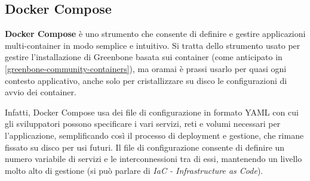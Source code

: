 \subsection{Docker Compose}
\label{docker-compose}
\textbf{Docker Compose} \cite{docker-compose} è uno strumento che consente di definire e gestire applicazioni multi-container in modo semplice e intuitivo. Si tratta dello strumento usato per gestire l'installazione di Greenbone basata sui container (come anticipato in \ref{greenbone-community-containers}), ma oramai è prassi usarlo per quasi ogni contesto applicativo, anche solo per cristallizzare su disco le configurazioni di avvio dei container.

Infatti, Docker Compose usa dei file di configurazione in formato YAML con cui gli sviluppatori possono specificare i vari servizi, reti e volumi necessari per l'applicazione, semplificando così il processo di deployment e gestione, che rimane fissato su disco per usi futuri. Il file di configurazione consente di definire un numero variabile di servizi e le interconnessioni tra di essi, mantenendo un livello molto alto di gestione (si può parlare di \emph{IaC - Infrastructure as Code}).